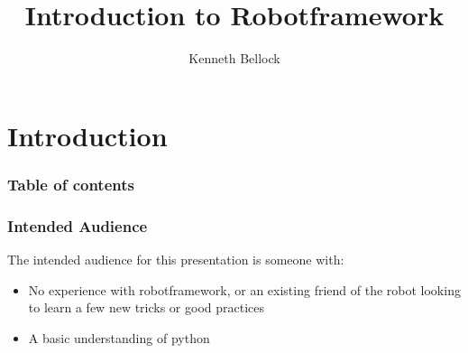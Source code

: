 \documentclass[xcolor=table,handout]{beamer}
\title{Introduction to Robotframework}
\author[K. Bellock]{Kenneth Bellock}
\date{\vspace*{-2.5em}\par \today}
\begin{document}
\section{Introduction}

\begin{frame}%
  \titlepage{}
\end{frame}

\begin{frame}\frametitle{Table of contents}
  \tableofcontents{}
\end{frame} 

\begin{frame}\frametitle{Intended Audience}
    The intended audience for this presentation is someone with:
    \begin{itemize}
        \item No experience with robotframework, or an existing friend of the robot looking to learn a few new tricks or good practices
        \item A basic understanding of python
    \end{itemize}
\end{frame}
\end{document}

